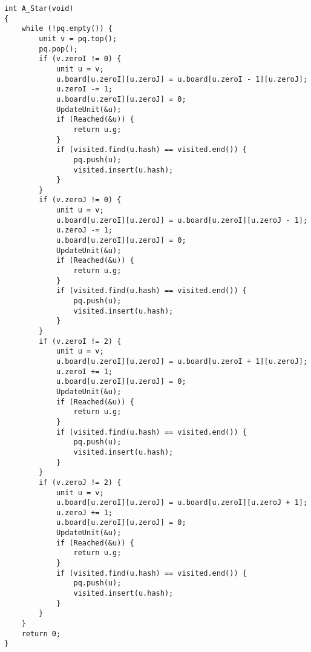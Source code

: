 \documentclass[UTF8,zihao=-4]{ctexart}
\begin{document}
\begin{itemize}
\begin{lstlisting}
int A_Star(void)
{
    while (!pq.empty()) {
        unit v = pq.top();
        pq.pop();
        if (v.zeroI != 0) {
            unit u = v;
            u.board[u.zeroI][u.zeroJ] = u.board[u.zeroI - 1][u.zeroJ];
            u.zeroI -= 1;
            u.board[u.zeroI][u.zeroJ] = 0;
            UpdateUnit(&u);
            if (Reached(&u)) {
                return u.g;
            }
            if (visited.find(u.hash) == visited.end()) {
                pq.push(u);
                visited.insert(u.hash);
            }
        }
        if (v.zeroJ != 0) {
            unit u = v;
            u.board[u.zeroI][u.zeroJ] = u.board[u.zeroI][u.zeroJ - 1];
            u.zeroJ -= 1;
            u.board[u.zeroI][u.zeroJ] = 0;
            UpdateUnit(&u);
            if (Reached(&u)) {
                return u.g;
            }
            if (visited.find(u.hash) == visited.end()) {
                pq.push(u);
                visited.insert(u.hash);
            }
        }
        if (v.zeroI != 2) {
            unit u = v;
            u.board[u.zeroI][u.zeroJ] = u.board[u.zeroI + 1][u.zeroJ];
            u.zeroI += 1;
            u.board[u.zeroI][u.zeroJ] = 0;
            UpdateUnit(&u);
            if (Reached(&u)) {
                return u.g;
            }
            if (visited.find(u.hash) == visited.end()) {
                pq.push(u);
                visited.insert(u.hash);
            }
        }
        if (v.zeroJ != 2) {
            unit u = v;
            u.board[u.zeroI][u.zeroJ] = u.board[u.zeroI][u.zeroJ + 1];
            u.zeroJ += 1;
            u.board[u.zeroI][u.zeroJ] = 0;
            UpdateUnit(&u);
            if (Reached(&u)) {
                return u.g;
            }
            if (visited.find(u.hash) == visited.end()) {
                pq.push(u);
                visited.insert(u.hash);
            }
        }
    }
    return 0;
}


\end{lstlisting}
\end{itemize}
\end{document}
